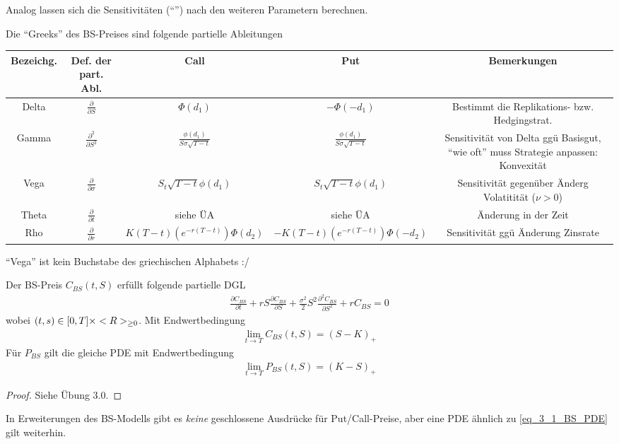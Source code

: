 Analog lassen sich die Sensitivitäten (``'') nach den weiteren Parametern berechnen.
\begin{definition}
	Die ``Greeks'' des BS-Preises sind folgende partielle Ableitungen\\
	\begin{tabular}{|c|c|c|c|c|} %
		Bezeichg. & Def. der part. Abl. & Call & Put & Bemerkungen\\
		\hline
		Delta & $\frac{\partial}{\partial S}$ & $\Phi(d_1)$ & $-\Phi(-d_1)$ & Bestimmt die Replikations- bzw. Hedgingstrat.\\
		Gamma & $\frac{\partial^2}{\partial S^2}$ & $\frac{\phi(d_1)}{S\sigma\sqrt{T-t}}$ & $\frac{\phi(d_1)}{S\sigma\sqrt{T-t}}$ & Sensitivität von Delta ggü Basisgut, ``wie oft'' muss Strategie anpassen: Konvexität\\
		Vega & $\frac{\partial}{\partial \sigma}$ & $S_t \sqrt{T-t}\phi(d_1)$ & $S_t \sqrt{T-t}\phi(d_1)$ & Sensitivität gegenüber Änderg Volatitität ($\nu >0$)\\
		Theta & $\frac{\partial}{\partial t}$ & siehe ÜA & siehe ÜA & Änderung in der Zeit\\
		Rho & $\frac{\partial}{\partial r}$ & $K(T-t)(e^{-r(T-t)}) \Phi(d_2)$ & $-K(T-t)(e^{-r(T-t)}) \Phi(-d_2)$ & Sensitivität ggü Änderung Zinsrate
	\end{tabular}
\end{definition}
\begin{*remark}
	``Vega'' ist kein Buchstabe des griechischen Alphabets :/
\end{*remark}
\begin{conclusion}
	Der BS-Preis $C_{BS}(t,S)$ erfüllt folgende partielle DGL
	\begin{align*}
		\frac{\partial C_{BS}}{\partial t} + rS\frac{\partial C_{BS}}{\partial S} + \frac{\sigma^2}{2}S^2 \frac{\partial^2 C_{BS}}{\partial S^2}+rC_{BS} = 0 \tag{BS-PDE}\label{eq_3_1_BS_PDE}
	\end{align*}
	wobei $(t,s) \in [0,T]\times <R>_{\ge 0}$. Mit Endwertbedingung
	\begin{align*}
		\lim_{t \to T} C_{BS}(t,S) = (S-K)_+
	\end{align*}
	Für $P_{BS}$ gilt die gleiche PDE mit Endwertbedingung
	\begin{align*}
		\lim_{t \to T} P_{BS}(t,S) = (K-S)_+
	\end{align*}
\end{conclusion}
\begin{proof}
	Siehe Übung 3.0.
\end{proof}
\begin{*remark}
	In Erweiterungen des BS-Modells gibt es \emph{keine} geschlossene Ausdrücke für Put/Call-Preise, aber eine PDE ähnlich zu \eqref{eq_3_1_BS_PDE} gilt weiterhin.
\end{*remark}

